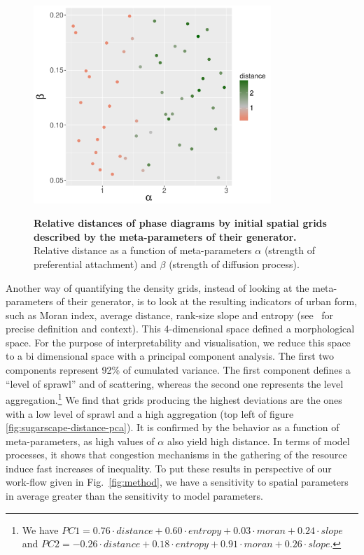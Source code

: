\documentclass[Royal,sageh,times]{sagej}
\begin{document}
\begin{figure}
\centering
\includegraphics[width=0.8\textwidth]{figures/relativedistance_metaparams}\\
\caption{\textbf{Relative distances of phase diagrams by initial spatial grids described by the meta-parameters of their generator.} Relative distance as a function of meta-parameters $\alpha$ (strength of preferential attachment) and $\beta$ (strength of diffusion process). }
\label{fig:sugarscape-distance-meta}
\end{figure}

Another way of quantifying the density grids, instead of looking at the meta-parameters of their generator, is to look at the resulting indicators of urban form, such as Moran index, average distance, rank-size slope and entropy (see~\cite{LeNechet2015} for precise definition and context). This 4-dimensional space defined a morphological space. For the purpose of interpretability and visualisation, we reduce this space to a bi dimensional space with a principal component analysis. The first two components represent 92\% of cumulated variance. The first component defines a ``level of sprawl'' and of scattering, whereas the second one represents the level aggregation.\footnote{We have $PC1 = 0.76\cdot distance + 0.60\cdot entropy + 0.03\cdot moran + 0.24\cdot slope$ and $PC2 = -0.26\cdot distance + 0.18\cdot entropy + 0.91\cdot moran + 0.26\cdot slope$.} We find that grids producing the highest deviations are the ones with a low level of sprawl and a high aggregation (top left of figure \ref{fig:sugarscape-distance-pca}). It is confirmed by the behavior as a function of meta-parameters, as high values of $\alpha$ also yield high distance. In terms of model processes, it shows that congestion mechanisms in the gathering of the resource induce fast increases of inequality. To put these results in perspective of our work-flow given in Fig.~\ref{fig:method}, we have a sensitivity to spatial parameters in average greater than the sensitivity to model parameters.
\end{document}
